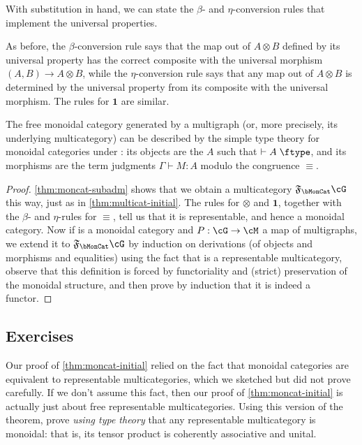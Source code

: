 \documentclass{book}
\let\types\vdash
\def\type{\;\ftype}
\newcommand{\F}[1]{\mathfrak{F}_{#1}}
\def\match{\mathsf{match}}
\def\one{\mathbf{1}}
\def\ott{\mathord{\star}}%
\let\tensor\otimes
\def\tpair#1#2{\text{\textlquill} #1,#2 \text{\textrquill}}%
\begin{document}
With substitution in hand, we can state the $\beta$- and $\eta$-conversion rules that implement the universal properties.
As before, the $\beta$-conversion rule says that the map out of $A\tensor B$ defined by its universal property has the correct composite with the universal morphism $(A,B)\to A\tensor B$, while the $\eta$-conversion rule says that any map out of $A\tensor B$ is determined by the universal property from its composite with the universal morphism.
The rules for $\one$ are similar.

\begin{thm}\label{thm:moncat-initial}
  The free monoidal category generated by a multigraph \cG (or, more precisely, its underlying multicategory) can be described by the simple type theory for monoidal categories under \cG: its objects are the $A$ such that $\types A\type$, and its morphisms are the term judgments $\Gamma\types M:A$ modulo the congruence $\equiv$.
\end{thm}
\begin{proof}
  \cref{thm:moncat-subadm} shows that we obtain a multicategory $\F\bMonCat\cG$ this way, just as in \cref{thm:multicat-initial}.
  The rules for $\tensor$ and $\one$, together with the $\beta$- and $\eta$-rules for $\equiv$, tell us that it is representable, and hence a monoidal category.
  Now if \cM is a monoidal category and $P:\cG\to\cM$ a map of multigraphs, we extend it to $\F\bMonCat\cG$ by induction on derivations (of objects and morphisms and equalities) using the fact that \cM is a representable multicategory, observe that this definition is forced by functoriality and (strict) preservation of the monoidal structure, and then prove by induction that it is indeed a functor.
\end{proof}


\subsection*{Exercises}

\begin{ex}\label{ex:repmulticat-moncat}
  Our proof of \cref{thm:moncat-initial} relied on the fact that monoidal categories are equivalent to representable multicategories, which we sketched but did not prove carefully.
  If we don't assume this fact, then our proof of \cref{thm:moncat-initial} is actually just about free representable multicategories.
  Using this version of the theorem, prove \emph{using type theory} that any representable multicategory is monoidal: that is, its tensor product is coherently associative and unital.
\end{ex}
\end{document}
